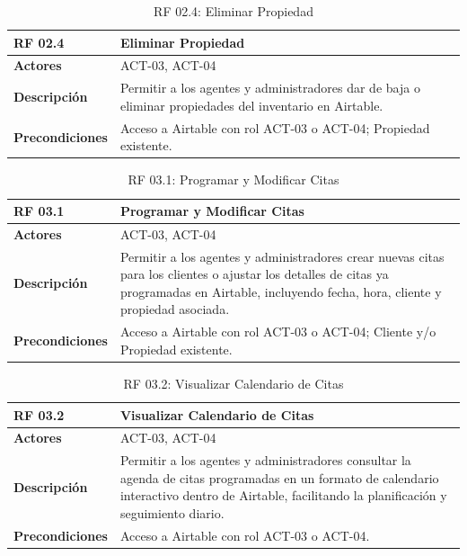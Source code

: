\begin{table}[H]
\centering
\begin{tabular}{|p{3cm}|p{10cm}|}
\hline
\rowcolor{tealblue}
\textbf{RF 02.4} & \textbf{Eliminar Propiedad} \\
\hline
\textbf{Actores} & ACT-03, ACT-04 \\
\hline
\textbf{Descripción} & Permitir a los agentes y administradores dar de baja o eliminar propiedades del inventario en Airtable. \\
\hline
\textbf{Precondiciones} & Acceso a Airtable con rol ACT-03 o ACT-04; Propiedad existente. \\
\hline
\end{tabular}
\caption{RF 02.4: Eliminar Propiedad}
\label{tab:rf_airtable_2_4}
\end{table}

\begin{table}[H]
\centering
\begin{tabular}{|p{3cm}|p{10cm}|}
\hline
\rowcolor{tealblue}
\textbf{RF 03.1} & \textbf{Programar y Modificar Citas} \\
\hline
\textbf{Actores} & ACT-03, ACT-04 \\
\hline
\textbf{Descripción} & Permitir a los agentes y administradores crear nuevas citas para los clientes o ajustar los detalles de citas ya programadas en Airtable, incluyendo fecha, hora, cliente y propiedad asociada. \\
\hline
\textbf{Precondiciones} & Acceso a Airtable con rol ACT-03 o ACT-04; Cliente y/o Propiedad existente. \\
\hline
\end{tabular}
\caption{RF 03.1: Programar y Modificar Citas}
\label{tab:rf_airtable_3_1}
\end{table}

\begin{table}[H]
\centering
\begin{tabular}{|p{3cm}|p{10cm}|}
\hline
\rowcolor{tealblue}
\textbf{RF 03.2} & \textbf{Visualizar Calendario de Citas} \\
\hline
\textbf{Actores} & ACT-03, ACT-04 \\
\hline
\textbf{Descripción} & Permitir a los agentes y administradores consultar la agenda de citas programadas en un formato de calendario interactivo dentro de Airtable, facilitando la planificación y seguimiento diario. \\
\hline
\textbf{Precondiciones} & Acceso a Airtable con rol ACT-03 o ACT-04. \\
\hline
\end{tabular}
\caption{RF 03.2: Visualizar Calendario de Citas}
\label{tab:rf_airtable_3_2}
\end{table}

